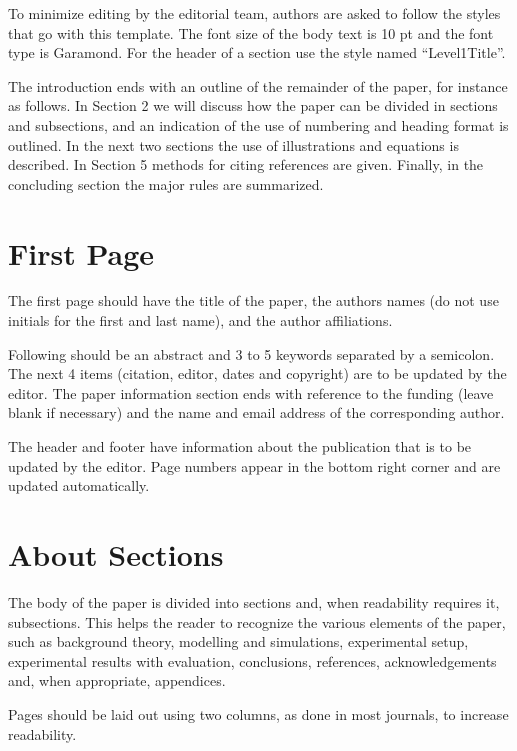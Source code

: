 \documentclass[10pt]{../imeko_acta}
\begin{document}
To minimize editing by the editorial team, authors are asked 
to follow the styles that go with this template. The font size of 
the body text is 10 pt and the font type is Garamond. For the 
header of a section use the style named “Level1Title”.

The introduction ends with an outline of the remainder of the 
paper, for instance as follows. In Section 2 we will discuss how 
the paper can be divided in sections and subsections, and an 
indication of the use of numbering and heading format is 
outlined. In the next two sections the use of illustrations and 
equations is described. In Section 5 methods for citing references 
are given. Finally, in the concluding section the major rules are 
summarized.\vfill\par

\section{First Page}

The first page should have the title of the paper, the authors names (do not use initials for the first and last name), and the author affiliations.

Following should be an abstract and 3 to 5 keywords separated by a semicolon. The next 4 items (citation, editor, dates and copyright) are to be updated by the editor. The paper information section ends with reference to the funding (leave blank if necessary) and the name and email address of the corresponding author. %

The header and footer have information about the publication that is to be updated by the editor. Page numbers appear in the bottom right corner and are updated automatically. 

\section{About Sections}

The body of the paper is divided into sections and, when readability requires it, subsections. This helps the reader to recognize the various elements of the paper, such as background theory, modelling and simulations, experimental setup, experimental results with evaluation, conclusions, references, acknowledgements and, when appropriate, appendices. 

Pages should be laid out using two columns, as done in most journals, to increase readability.
\end{document}
